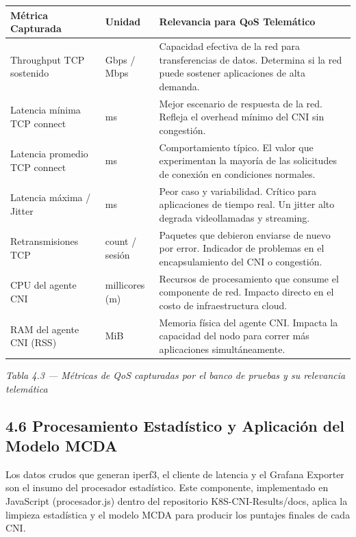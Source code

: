 \documentclass[journal]{IEEEtran}
\begin{document}
\begin{table}[htbp]
\centering
\scriptsize
\begin{tabularx}{\textwidth}{|Y|Y|Y|}
\hline
\textbf{Métrica Capturada} & \textbf{Unidad} & \textbf{Relevancia para QoS Telemático} \\
\hline
Throughput TCP sostenido & Gbps / Mbps & Capacidad efectiva de la red para transferencias de datos. Determina si la red puede sostener aplicaciones de alta demanda. \\
Latencia mínima TCP connect & ms & Mejor escenario de respuesta de la red. Refleja el overhead mínimo del CNI sin congestión. \\
Latencia promedio TCP connect & ms & Comportamiento típico. El valor que experimentan la mayoría de las solicitudes de conexión en condiciones normales. \\
Latencia máxima / Jitter & ms & Peor caso y variabilidad. Crítico para aplicaciones de tiempo real. Un jitter alto degrada videollamadas y streaming. \\
Retransmisiones TCP & count / sesión & Paquetes que debieron enviarse de nuevo por error. Indicador de problemas en el encapsulamiento del CNI o congestión. \\
CPU del agente CNI & millicores (m) & Recursos de procesamiento que consume el componente de red. Impacto directo en el costo de infraestructura cloud. \\
RAM del agente CNI (RSS) & MiB & Memoria física del agente CNI. Impacta la capacidad del nodo para correr más aplicaciones simultáneamente. \\
\hline
\end{tabularx}
\end{table}

\begin{center}\emph{\emph{Tabla 4.3 --- Métricas de QoS capturadas por el banco de pruebas y su relevancia telemática}}\end{center}

\subsection{4.6 Procesamiento Estadístico y Aplicación del Modelo MCDA}

Los datos crudos que generan iperf3, el cliente de latencia y el Grafana Exporter son el insumo del procesador estadístico. Este componente, implementado en JavaScript (procesador.js) dentro del repositorio K8S-CNI-Results/docs, aplica la limpieza estadística y el modelo MCDA para producir los puntajes finales de cada CNI.
\end{document}
